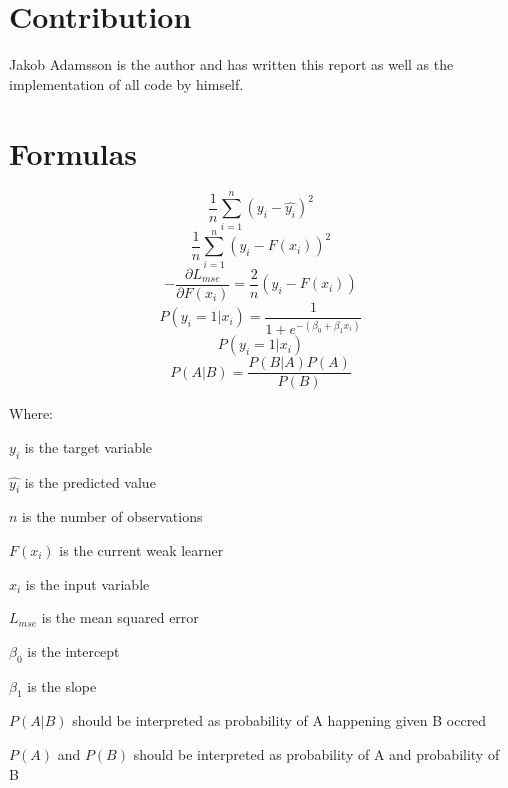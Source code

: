 \documentclass[conference]{IEEEtran}
\begin{document}
\section{Contribution}
Jakob Adamsson is the author and has written this report as well as the implementation of all code by himself.
\clearpage
\section{Formulas}
\begin{equation}
\label{MSE}
\frac{1}{n}\sum_{i=1}^{n} (y_i - \hat{y_i})^2
\end{equation}
\begin{equation}
\label{L_MSE}
\frac{1}{n}\sum_{i=1}^{n} (y_i - F(x_i))^2
\end{equation}
\begin{equation}
\label{L_MSE_D}
-\frac{\partial{L_{mse}}}{\partial{F(x_i)}} = \frac{2}{n}(y_i - F(x_i))
\end{equation}
\begin{equation}
\label{lr}
P(y_i = 1|x_i) = \frac{1}{1 + e^{-(\beta_0 + \beta_1x_i)}}
\end{equation}
\begin{equation}
\label{lr}
P(y_i = 1|x_i)
\end{equation}
\begin{equation}
\label{Bayes_theorem}
P(A|B) = \frac{P(B|A)P(A)}{P(B)}
\end{equation}

Where:

$y_i$ is the target variable

$\hat{y_i}$ is the predicted value

$n$ is the number of observations

$F(x_i)$ is the current weak learner

$x_i$ is the input variable

$L_{mse}$ is the mean squared error

$\beta_0$ is the intercept

$\beta_1$ is the slope

$P(A|B)$ should be interpreted as probability of A happening given B occred

$P(A)$ and $P(B)$ should be interpreted as probability of A and probability of B




\clearpage

\end{document}

